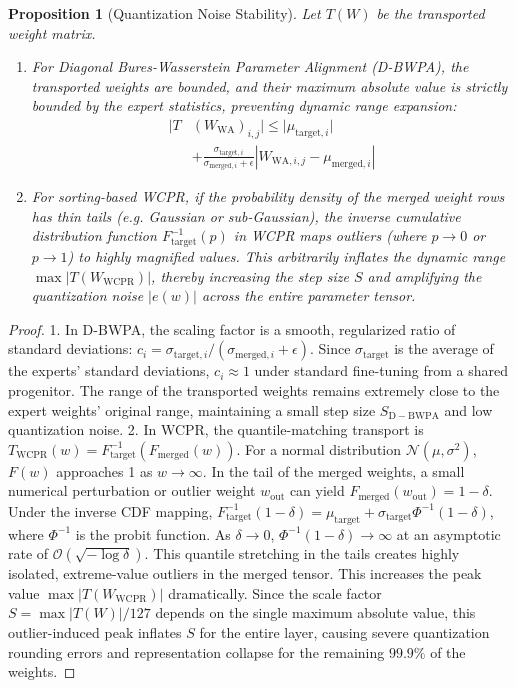 \documentclass{article}
\theoremstyle{plain}
\newtheorem{proposition}[theorem]{Proposition}
\theoremstyle{definition}
\theoremstyle{remark}
\begin{document}
\begin{proposition}[Quantization Noise Stability]
Let $T(W)$ be the transported weight matrix.
\begin{enumerate}
  \item For Diagonal Bures-Wasserstein Parameter Alignment (D-BWPA), the transported weights are bounded, and their maximum absolute value is strictly bounded by the expert statistics, preventing dynamic range expansion:
  \begin{equation}
  \begin{split}
    |T&(W_{\mathrm{WA}})_{i,j}| \le |\mu_{\mathrm{target}, i}| \\
    &+ \frac{\sigma_{\mathrm{target}, i}}{\sigma_{\mathrm{merged}, i} + \epsilon} |W_{\mathrm{WA}, i,j} - \mu_{\mathrm{merged}, i}|
  \end{split}
  \end{equation}
  \item For sorting-based WCPR, if the probability density of the merged weight rows has thin tails (e.g. Gaussian or sub-Gaussian), the inverse cumulative distribution function $F_{\mathrm{target}}^{-1}(p)$ in WCPR maps outliers (where $p \to 0$ or $p \to 1$) to highly magnified values. This arbitrarily inflates the dynamic range $\max |T(W_{\mathrm{WCPR}})|$, thereby increasing the step size $S$ and amplifying the quantization noise $|e(w)|$ across the entire parameter tensor.
\end{enumerate}
\end{proposition}

\begin{proof}
1. In D-BWPA, the scaling factor is a smooth, regularized ratio of standard deviations: $c_i = \sigma_{\mathrm{target}, i} / (\sigma_{\mathrm{merged}, i} + \epsilon)$. Since $\sigma_{\mathrm{target}}$ is the average of the experts' standard deviations, $c_i \approx 1$ under standard fine-tuning from a shared progenitor. The range of the transported weights remains extremely close to the expert weights' original range, maintaining a small step size $S_{\mathrm{D-BWPA}}$ and low quantization noise.
2. In WCPR, the quantile-matching transport is $T_{\mathrm{WCPR}}(w) = F_{\mathrm{target}}^{-1}(F_{\mathrm{merged}}(w))$. For a normal distribution $\mathcal{N}(\mu, \sigma^2)$, $F(w)$ approaches 1 as $w \to \infty$. In the tail of the merged weights, a small numerical perturbation or outlier weight $w_{\mathrm{out}}$ can yield $F_{\mathrm{merged}}(w_{\mathrm{out}}) = 1 - \delta$. Under the inverse CDF mapping, $F_{\mathrm{target}}^{-1}(1 - \delta) = \mu_{\mathrm{target}} + \sigma_{\mathrm{target}} \Phi^{-1}(1 - \delta)$, where $\Phi^{-1}$ is the probit function. As $\delta \to 0$, $\Phi^{-1}(1 - \delta) \to \infty$ at an asymptotic rate of $\mathcal{O}(\sqrt{-\log \delta})$. This quantile stretching in the tails creates highly isolated, extreme-value outliers in the merged tensor. This increases the peak value $\max |T(W_{\mathrm{WCPR}})|$ dramatically. Since the scale factor $S = \max |T(W)| / 127$ depends on the single maximum absolute value, this outlier-induced peak inflates $S$ for the entire layer, causing severe quantization rounding errors and representation collapse for the remaining $99.9\%$ of the weights.
\end{proof}
\end{document}
